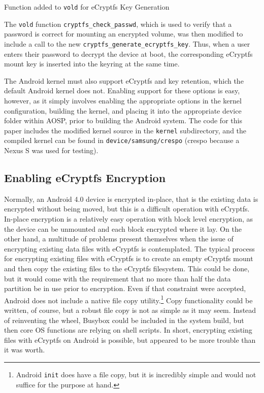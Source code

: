 \begin{table} 
 
\caption{Function added to \texttt{vold} for eCryptfs Key Generation}
\label{tab:generate-key}
\end{table}

The \texttt{vold} function \texttt{cryptfs\_check\_passwd}, which is used to verify that a password is correct for mounting an
encrypted volume, was then modified to include a call to the new \texttt{cryptfs\_generate\_ecryptfs\_key}. Thus, when a user enters
their password to decrypt the device at boot, the corresponding eCryptfs mount key is inserted into the keyring at the same time.

The Android kernel must also support eCryptfs and key retention, which the default Android kernel does not. Enabling support for
these options is easy, however, as it simply involves enabling the appropriate options in the kernel configuration, building the
kernel, and placing it into the appropriate device folder within AOSP, prior to building the Android system. The code for this paper
includes the modified kernel source in the \texttt{kernel} subdirectory, and the compiled kernel can be found in
\texttt{device/samsung/crespo} (crespo because a Nexus S was used for testing).

\subsection{Enabling eCryptfs Encryption} Normally, an Android 4.0 device is encrypted in-place, that is the existing data is
encrypted without being moved, but this is a difficult operation with eCryptfs. In-place encryption is a relatively easy operation
with block level encryption, as the device can be unmounted and each block encrypted where it lay. On the other hand, a multitude of
problems present themselves when the issue of encrypting existing data files with eCryptfs is contemplated.  The typical process for
encrypting existing files with eCryptfs is to create an empty eCryptfs mount and then copy the existing files to the eCryptfs
filesystem.  This could be done, but it would come with the requirement that no more than half the data partition be in use prior to
encryption. Even if that constraint were accepted, Android does not include a native file copy utility.\footnote{Android
\texttt{init} does have a file copy, but it is incredibly simple and would not suffice for the purpose at hand.} Copy functionality
could be written, of course, but a robust file copy is not as simple as it may seem. Instead of reinventing the wheel, Busybox could
be included in the system build, but then core OS functions are relying on shell scripts. In short, encrypting existing files with
eCryptfs on Android is possible, but appeared to be more trouble than it was worth.

